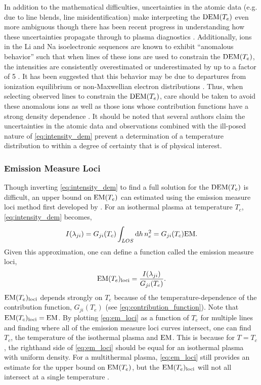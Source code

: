 In addition to the mathematical difficulties, uncertainties in the atomic data (e.g. due to line blends, line misidentification) make interpreting the $\dem$ even more ambiguous though there has been recent progress in understanding how these uncertainties propagate through to plasma diagnostics \citep[e.g.][]{yu_incorporating_2018,del_zanna_uncertainties_2019}. Additionally, ions in the Li and Na isoelectronic sequences are known to exhibit ``anomalous behavior'' such that when lines of these ions are used to constrain the $\dem$, the intensities are consistently overestimated or underestimated by up to a factor of 5 \citep{burton_w._m._discussion_1971,dupree_analysis_1972,del_zanna_spectroscopic_2002}. It has been suggested that this behavior may be due to departures from ionization equilibrium or non-Maxwellian electron distributions \citep{del_zanna_solar_2018}. Thus, when selecting observed lines to constrain the $\dem$, care should be taken to avoid these anomalous ions as well as those ions whose contribution functions have a strong density dependence \citep[e.g. Fe IX][]{del_zanna_solar_2018}. It should be noted that several authors \citep{craig_fundamental_1976,judge_failure_1995,judge_fundamental_1997,judge_coronal_2010} claim the uncertainties in the atomic data and observations combined with the ill-posed nature of \autoref{eq:intensity_dem} prevent a determination of a temperature distribution to within a degree of certainty that is of physical interest.

\subsubsection{Emission Measure Loci}

Though inverting \autoref{eq:intensity_dem} to find a full solution for the $\dem$ is difficult, an upper bound on $\emd$ can estimated using the emission measure loci method first developed by \citet{veck_solar_1981}. For an isothermal plasma at temperature $T_c$, \autoref{eq:intensity_dem} becomes,
\begin{equation}
    I(\lambda_{ji}) = G_{ji}(T_c)\int_{LOS}\dd{h}n_e^2 = G_{ji}(T_c)\textup{EM}.
\end{equation}
Given this approximation, one can define a function called the emission measure loci,
\begin{equation}\label{eq:em_loci}
    \emd_{\textup{loci}} = \frac{I(\lambda_{ji})}{G_{ji}(T_e)}.
\end{equation}
$\emd_{\textup{loci}}$ depends strongly on $T_e$ because of the temperature-dependence of the contribution function, $G_{ji}(T_e)$ (see \autoref{eq:contribution_function}). Note that $\emd[T_c]_{\textup{loci}}=\textup{EM}$. By plotting \autoref{eq:em_loci} as a function of $T_e$ for multiple lines and finding where all of the emission measure loci curves intersect, one can find $T_c$, the temperature of the isothermal plasma and $\textup{EM}$. This is because for $T=T_c$, the righthand side of \autoref{eq:em_loci} should be equal for an isothermal plasma with uniform density. For a multithermal plasma, \autoref{eq:em_loci} still provides an estimate for the upper bound on $\emd$, but the $\emd_{\textup{loci}}$ will not all intersect at a single temperature \citep{phillips_ultraviolet_2008}.

